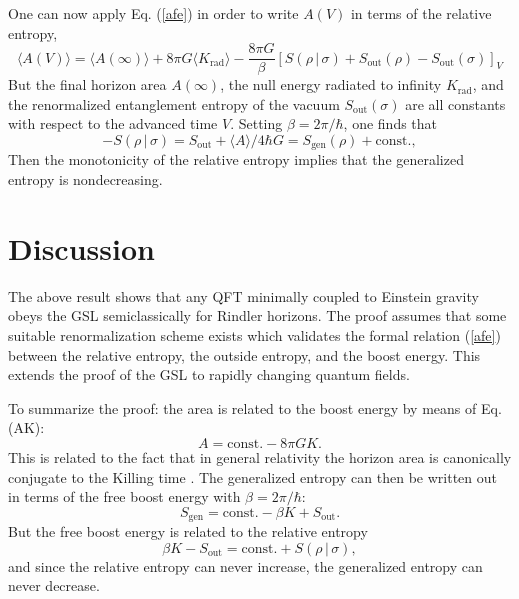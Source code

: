 \documentclass[12pt]{article}
\begin{document}
One can now apply Eq. (\ref{afe}) in order to write $A(V)$ in terms of the relative entropy,
\begin{equation}
\langle A(V) \rangle = \langle A(\infty) \rangle + 8\pi G \langle K_\mathrm{rad} \rangle - \frac{8\pi G}{\beta}[S(\rho\,|\,\sigma) + S_\mathrm{out}(\rho) - S_\mathrm{out}(\sigma)]_V
\end{equation}
But the final horizon area $A(\infty)$, the null energy radiated to infinity $K_\mathrm{rad}$, and the renormalized entanglement entropy of the vacuum $S_\mathrm{out}(\sigma)$ are all constants with respect to the advanced time $V$.  Setting $\beta = 2\pi / \hbar$, one finds that
\begin{equation}\label{final}
-S(\rho\,|\,\sigma) = 
S_\mathrm{out} + \langle A \rangle /{4\hbar G} = S_\mathrm{gen}(\rho) + \mathrm{const.},
\end{equation}
Then the monotonicity of the relative entropy implies that the generalized entropy is nondecreasing.

\section{Discussion}\label{dis}

The above result shows that any QFT minimally coupled to Einstein gravity obeys the GSL semiclassically for Rindler horizons.  The proof assumes that some suitable renormalization scheme exists which validates the formal relation (\ref{afe}) between the relative entropy, the outside entropy, and the boost energy.  This extends the proof of the GSL to rapidly changing quantum fields.

To summarize the proof: the area is related to the boost energy by means of Eq. (AK):
\begin{equation}
A = \mathrm{const.} - 8\pi G K.
\end{equation}
This is related to the fact that in general relativity the horizon area is canonically conjugate to the Killing time \cite{CT93}.  The generalized entropy can then be written out in terms of the free boost energy with $\beta = 2\pi / \hbar$:
\begin{equation}
S_\mathrm{gen} = \mathrm{const.} - \beta K + S_\mathrm{out}.
\end{equation}
But the free boost energy is related to the relative entropy
\begin{equation}
\beta K - S_\mathrm{out} = \mathrm{const.} + S(\rho\,|\,\sigma),
\end{equation}
and since the relative entropy can never increase, the generalized entropy can never decrease.
\end{document}
